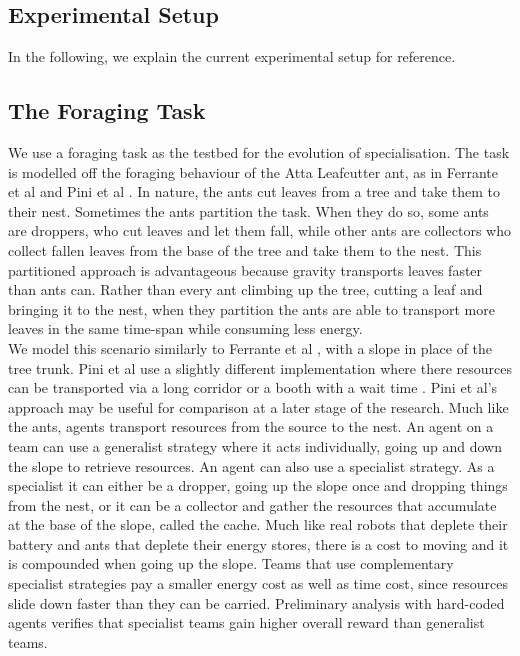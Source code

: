 \documentclass[12pt]{article}
\begin{document}
\begin{appendices}

\section{Experimental Setup}\label{experimental_setup}

In the following, we explain the current experimental setup for reference.

\subsection{The Foraging Task}\label{task_description}

We use a foraging task as the testbed for the evolution of specialisation.
The task is modelled off the foraging behaviour of the Atta Leafcutter ant, as in Ferrante et al \cite{ferrante:PLOS_CB:2015} and Pini et al \cite{pini:ICSI:2012, pini:Swarm_Intelligence:2011}.
In nature, the ants cut leaves from a tree and take them to their nest. 
Sometimes the ants partition the task. 
When they do so, some ants are droppers, who cut leaves and let them fall, while other ants are collectors who collect fallen leaves from the base of the tree and take them to the nest.
This partitioned approach is advantageous because gravity transports leaves faster than ants can.
Rather than every ant climbing up the tree, cutting a leaf and bringing it to the nest, when they partition the ants are able to transport more leaves in the same time-span while consuming less energy.\\

We model this scenario similarly to Ferrante et al \cite{ferrante:PLOS_CB:2015}, with a slope in place of the tree trunk. 
Pini et al use a slightly different implementation where there resources can be transported via a long corridor or a booth with a wait time \cite{pini:ICSI:2012, pini:Swarm_Intelligence:2011}. 
Pini et al's approach may be useful for comparison at a later stage of the research.
Much like the ants, agents transport resources from the source to the nest.
An agent on a team can use a generalist strategy where it acts individually, going up and down the slope to retrieve resources.
An agent can also use a specialist strategy. 
As a specialist it can either be a dropper, going up the slope once and dropping things from the nest, or it can be a collector and gather the resources that accumulate at the base of the slope, called the cache.
Much like real robots that deplete their battery and ants that deplete their energy stores, there is a cost to moving and it is compounded when going up the slope. 
Teams that use complementary specialist strategies pay a smaller energy cost as well as time cost, since resources slide down faster than they can be carried. 
Preliminary analysis with hard-coded agents verifies that specialist teams gain higher overall reward than generalist teams.\\


\end{appendices}
\end{document}
